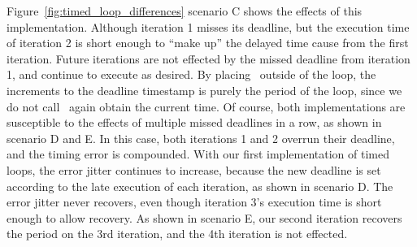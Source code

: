 Figure~\ref{fig:timed_loop_differences} scenario C shows the effects of this implementation. 
Although iteration 1 misses its deadline, but the execution time of iteration 2 is short enough to ``make up'' the delayed time cause from the first iteration.
Future iterations are not effected by the missed deadline from iteration 1, and continue to execute as desired.
By placing \gettime\ outside of the loop, the increments to the deadline timestamp is purely the period of the loop, since we do not call \gettime\ again obtain the current time.
Of course, both implementations are susceptible to the effects of multiple missed deadlines in a row, as shown in scenario D and E.
In this case, both iterations 1 and 2 overrun their deadline, and the timing error is compounded.
With our first implementation of timed loops, the error jitter continues to increase, because the new deadline is set according to the late execution of each iteration, as shown in scenario D. 
The error jitter never recovers, even though iteration 3's execution time is short enough to allow recovery. 
As shown in scenario E, our second iteration recovers the period on the 3rd iteration, and the 4th iteration is not effected. 

